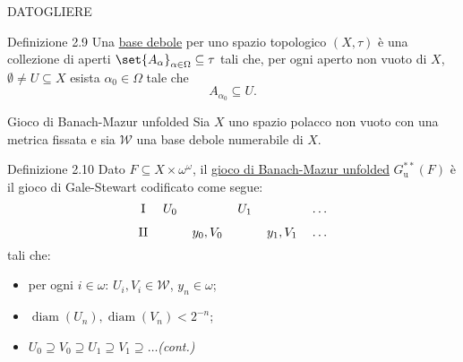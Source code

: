 \documentclass[babel]{beamer}
\renewcommand{\href}[2]{#2}
\begin{document}
\begin{frame}[label={sec:org465e651}]{DATOGLIERE}
\begin{block}{Definizione 2.9}
Una \uline{base debole} per uno spazio topologico \((X,\tau)\) è una collezione di aperti \(\set{A_{\alpha}}_{\alpha \in \Omega} \subseteq \tau\) tali che, per ogni aperto non vuoto di \(X\), \(\emptyset\neq U \subseteq X\) esista \(\alpha_{0} \in \Omega\) tale che
\begin{equation*}
A_{\alpha_{0}} \subseteq U.
\end{equation*}
\end{block}
\end{frame}
\begin{frame}[label={sec:org0d0e532}]{Gioco di Banach-Mazur unfolded}
Sia \(X\) uno \href{../../../../../../../org/roam/20250301194013-spazio_polacco.org}{spazio polacco} non vuoto con una \href{../../../../../../../org/roam/20250301193511-spazio_metrico.org}{metrica} fissata e sia \(\mathcal{W}\) una \href{../../../../../../../org/roam/20250525113346-base_debole_di_uno_spazio_topologico.org}{base debole} \href{../../../../../../../org/roam/20250111143651-insieme_numerabile.org}{numerabile} di \(X\).
\begin{block}{Definizione 2.10}
Dato \(F \subseteq X\times \omega^{\omega}\), il \uline{gioco di Banach-Mazur unfolded} \(G^{**}_{\text{u}}(F)\) è il \href{../../../../../../../org/roam/20250513155732-logic_game.org}{gioco} \href{../../../../../../../org/roam/20250513171520-giochi_di_gale_stewart.org}{di Gale-Stewart} codificato come segue:
\begin{equation*}
\begin{tikzcd}[ampersand replacement=\&,cramped,sep=tiny]
	{\text{I}} \& {U_0} \&\& {U_1} \&\& \dots \\
	{\text{II}} \&\& {y_0,V_0} \&\& {y_1, V_{1}} \& \dots
\end{tikzcd}
\end{equation*}
tali che:
\begin{itemize}
\item per ogni \(i \in \omega\): \(U_{i}, V_{i} \in \mathcal{W}\), \(y_{n} \in \omega\);
\item \(\operatorname{diam}(U_{n}), \operatorname{diam}(V_{n}) < 2^{-n}\);
\item \(U_{0}\supseteq V_{0}\supseteq U_{1}\supseteq V_{1}\supseteq \dots\)\hfill \textit{(cont.)}
\end{itemize}
\end{block}
\end{frame}
\end{document}
